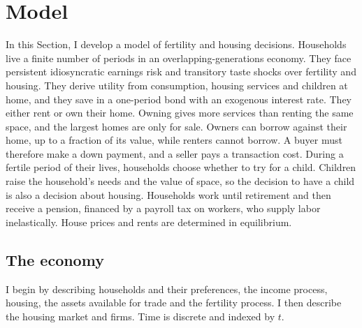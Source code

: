 \section{Model}
\label{sec:model}

In this Section, I develop a model of fertility and housing decisions.
Households live a finite number of periods in an overlapping-generations
economy. They face persistent idiosyncratic earnings risk and transitory taste
shocks over fertility and housing. They derive utility from consumption,
housing services and children at home, and they save in a one-period bond
with an exogenous interest rate.
They either rent or own their home. Owning gives more services than renting
the same space, and the largest homes are only for sale. Owners can borrow
against their home, up to a fraction of its value, while renters cannot
borrow. A buyer must therefore make a down payment, and a seller pays a
transaction cost. During a fertile period
of their lives, households choose whether to try for a child. Children raise
the household's needs and the value of space, so the decision to have a child
is also a decision about housing. Households work until retirement and then
receive a pension, financed by a payroll tax on workers, who supply labor
inelastically. House prices and rents are determined in equilibrium.

\subsection{The economy}
\label{sec:m-env}
I begin by describing households and their preferences, the income process,
housing, the assets available for trade and the fertility process. I then
describe the housing market and firms. Time is discrete and indexed by $t$.

